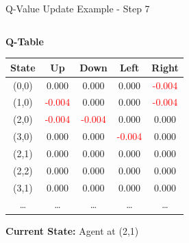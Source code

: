 \documentclass[aspectratio=169]{beamer}
\begin{document}
\begin{frame}{Q-Value Update Example - Step 7}
    
    \begin{columns}
        \begin{column}{0.45\textwidth}
            \textbf{Q-Table}
            \small
            \begin{table}[h]
                \centering
                \begin{tabular}{|c|c|c|c|c|}
                    \hline
                    \textbf{State} & \textbf{Up} & \textbf{Down} & \textbf{Left} & \textbf{Right} \\
                    \hline
                    (0,0) & 0.000 & 0.000 & 0.000 & \textcolor{red}{-0.004} \\
                    (1,0) & \textcolor{red}{-0.004} & 0.000 & 0.000 & \textcolor{red}{-0.004} \\
                    (2,0) & \textcolor{red}{-0.004} & \textcolor{red}{-0.004} & 0.000 & 0.000 \\
                    (3,0) & 0.000 & 0.000 & \textcolor{red}{-0.004} & 0.000 \\
                    (2,1) & 0.000 & 0.000 & 0.000 & 0.000 \\
                    (2,2) & 0.000 & 0.000 & 0.000 & 0.000 \\
                    (3,1) & 0.000 & 0.000 & 0.000 & 0.000 \\
                    \dots & \dots & \dots & \dots & \dots \\
                    \hline
                \end{tabular}
            \end{table}
            
            \textbf{Current State:} Agent at (2,1)

\end{column}
\end{columns}
\end{frame}
\end{document}

